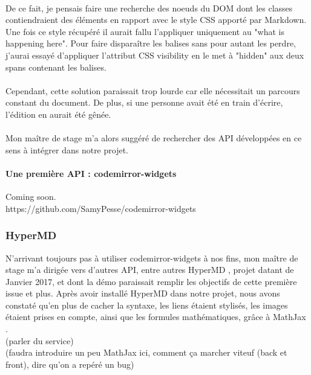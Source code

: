 \documentclass[12pt]{article}
\begin{document}
\paragraph{}
De ce fait, je pensais faire une recherche des noeuds du DOM dont les classes contiendraient des éléments en rapport avec le style CSS apporté par Markdown. Une fois ce style récupéré il aurait fallu l'appliquer uniquement au "what is happening here". Pour faire disparaître les balises sans pour autant les perdre, j'aurai essayé d'appliquer l'attribut CSS visibility en le met à "hidden" aux deux spans contenant les balises.
\paragraph{}
Cependant, cette solution paraissait trop lourde car elle nécessitait un parcours constant du document. De plus, si une personne avait été en train d'écrire, l'édition en aurait été gênée.

\paragraph{}
Mon maître de stage m'a alors suggéré de rechercher des API développées en ce sens à intégrer dans notre projet.

\paragraph{Une première API : codemirror-widgets}
Coming soon.\\
https://github.com/SamyPesse/codemirror-widgets


\subsubsection{HyperMD}
N'arrivant toujours pas à utiliser codemirror-widgets à nos fins, mon maître de stage m'a dirigée vers d'autres API, entre autres HyperMD \cite{hypermd}, projet datant de Janvier 2017, et dont la démo \cite{demo} paraissait remplir les objectifs de cette première issue et plus.
Après avoir installé HyperMD dans notre projet, nous avons constaté qu'en plus de cacher la syntaxe, les liens étaient stylisés, les images étaient prises en compte, ainsi que les formules mathématiques, grâce à MathJax \cite{mathjax}.\\

(parler du service)\\
(faudra introduire un peu MathJax ici, comment ça marcher viteuf (back et front), dire qu'on a repéré un bug)\\
\end{document}
